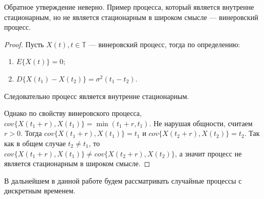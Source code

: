 \begin{Remark}
	Обратное утверждение неверно. Пример процесса, который является внутренне стационарным, но не является стационарным в широком смысле --- винеровский процесс.
\end{Remark}
\begin{proof}
	Пусть $ X(t), t \in \mathbb{T} $ --- винеровский процесс, тогда по определению:
	\begin{enumerate}
		\item $ E \{ X(t) \} = 0 $;
		\item $ D \{ X(t_1) - X(t_2)\} = \sigma^{2}(t_1 - t_2) $.
	\end{enumerate}
	Следовательно процесс является внутренне стационарным.

  Однако по свойству винеровского процесса, $ cov \{ X(t_1 + r), X(t_1)\} = \min(t_1 + r, t_1) $. Не нарушая общности, считаем $ r > 0 $. Тогда $ cov \{ X(t_1 + r), X(t_1)\} = t_1 $ и $ cov \{ X(t_2 + r), X(t_2)\} = t_2 $. Так как в общем случае $ t_2 \ne t_1 $, то $ cov \{ X(t_1 + r), X(t_1)\} \ne cov \{ X(t_2 + r), X(t_2)\} $, а значит процесс не является стационарным в широком смысле.
\end{proof}

%

В дальнейшем в данной работе будем рассматривать случайные процессы с дискретным временем.
